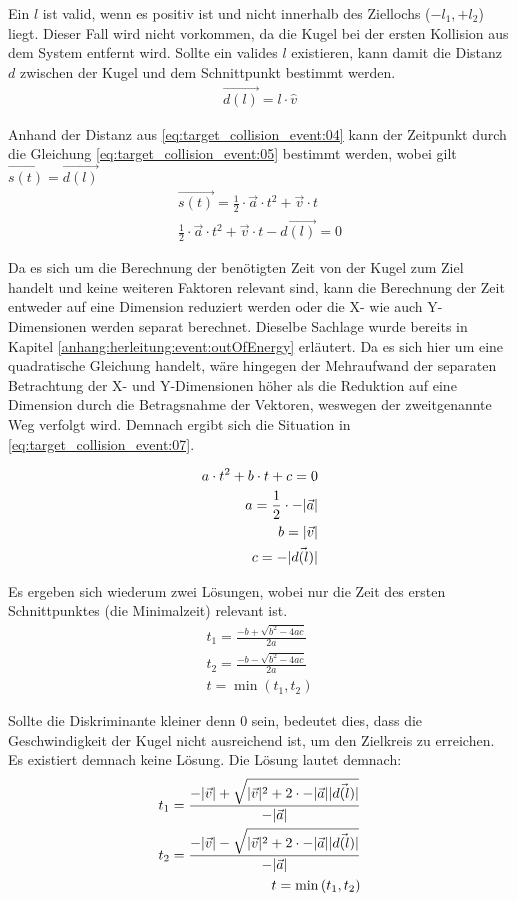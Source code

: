 Ein $l$ ist valid, wenn es positiv ist und nicht innerhalb des Ziellochs ($-l_1, +l_2$) liegt.
Dieser Fall wird nicht vorkommen, da die Kugel bei der ersten Kollision aus dem System entfernt wird.
Sollte ein valides $l$ existieren, kann damit die Distanz $d$ zwischen der Kugel und dem Schnittpunkt bestimmt werden.
\begin{align}
    \vec{d(l)} = l \cdot \hat{v}\label{eq:target_collision_event:04}
\end{align}

Anhand der Distanz aus \ref{eq:target_collision_event:04} kann der Zeitpunkt durch die Gleichung \ref{eq:target_collision_event:05}
bestimmt werden, wobei gilt $\vec{s(t)} = \vec{d(l)}$
\begin{align}
    \vec{s(t)} = \frac{1}{2} \cdot \vec{a} \cdot t^2 + \vec{v} \cdot t\\\label{eq:target_collision_event:05}
    \frac{1}{2} \cdot \vec{a} \cdot t^2 + \vec{v} \cdot t - \vec{d(l)} = 0
\end{align}

Da es sich um die Berechnung der benötigten Zeit von der Kugel zum Ziel handelt und keine weiteren Faktoren relevant sind,
kann die Berechnung der Zeit entweder auf eine Dimension reduziert werden oder die X- wie auch Y-Dimensionen werden separat
berechnet. Dieselbe Sachlage wurde bereits in Kapitel \ref{anhang:herleitung:event:outOfEnergy} erläutert. Da es sich
hier um eine quadratische Gleichung handelt, wäre hingegen der Mehraufwand der separaten Betrachtung der X- und Y-Dimensionen
höher als die Reduktion auf eine Dimension durch die Betragsnahme der Vektoren, weswegen der zweitgenannte Weg verfolgt
wird. Demnach ergibt sich die Situation in \ref{eq:target_collision_event:07}.

\begin{align}
    a \cdot t^2 + b \cdot t + c = 0\\\label{eq:target_collision_event:07}
    a = \frac{1}{2} \cdot -\lvert \vec{a} \rvert\\
    b = \lvert \vec{v} \rvert\\
    c = -\lvert \vec{d(l)} \rvert
\end{align}

Es ergeben sich wiederum zwei Lösungen, wobei nur die Zeit des ersten Schnittpunktes (die Minimalzeit) relevant ist.
\begin{align}
    t_1 = \frac{-b + \sqrt{b^2 - 4ac}}{2a}\\
    t_2 = \frac{-b - \sqrt{b^2 - 4ac}}{2a}\\
    t = \min{(t_1, t_2)}
\end{align}

Sollte die Diskriminante kleiner denn $0$ sein, bedeutet dies, dass die Geschwindigkeit der Kugel nicht ausreichend
ist, um den Zielkreis zu erreichen. Es existiert demnach keine Lösung. Die Lösung lautet demnach:
\begin{align}
    t_1 = \frac{-\lvert \vec{v} \rvert + \sqrt{\lvert \vec{v} \rvert^2 + 2 \cdot -\lvert \vec{a} \rvert \lvert \vec{d(l)} \rvert}}{-\lvert \vec{a} \rvert}\\
    t_2 = \frac{-\lvert \vec{v} \rvert - \sqrt{\lvert \vec{v} \rvert^2 + 2 \cdot -\lvert \vec{a} \rvert \lvert \vec{d(l)} \rvert}}{-\lvert \vec{a} \rvert}\\
    t = \min{(t_1, t_2)}
\end{align}